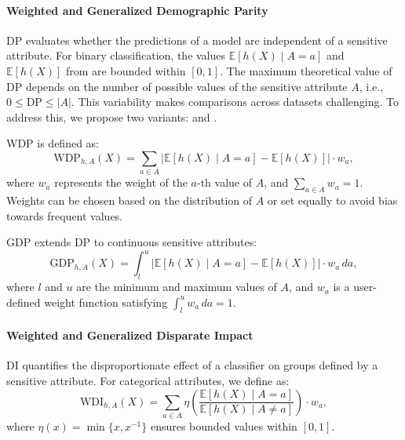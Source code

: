 \paragraph{Weighted and Generalized Demographic Parity}
%
\Gls{DP} evaluates whether the predictions of a model are independent of a sensitive attribute.
%
For binary classification, the values \( \mathbb{E}[h(X) \mid A = a] \) and \( \mathbb{E}[h(X)] \) from  are bounded within \([0, 1]\).
%
The maximum theoretical value of \gls{DP} depends on the number of possible values of the sensitive attribute \( A \), i.e., \( 0 \leq \text{DP} \leq |A| \).
%
This variability makes comparisons across datasets challenging.
%
To address this, we propose two variants:  and .


\Gls{WDP} is defined as:
%
\begin{equation}
    \label{eq:wdp}
    \text{WDP}_{h,A}(X) = \sum_{a \in A} \left| \mathbb{E}[h(X) \mid A = a] - \mathbb{E}[h(X)] \right| \cdot w_a,
\end{equation}
%
where \( w_a \) represents the weight of the \( a \)-th value of \( A \), and \( \sum_{a \in A} w_a = 1 \).
%
Weights can be chosen based on the distribution of \( A \) or set equally to avoid bias towards frequent values.


\Gls{GDP} extends \gls{DP} to continuous sensitive attributes:
%
\begin{equation}
    \label{eq:gdp}
    \text{GDP}_{h,A}(X) = \int_{l}^{u} \left| \mathbb{E}[h(X) \mid A = a] - \mathbb{E}[h(X)] \right| \cdot w_a \, da,
\end{equation}
%
where \( l \) and \( u \) are the minimum and maximum values of \( A \), and \( w_a \) is a user-defined weight function satisfying \( \int_{l}^{u} w_a \, da = 1 \).



\paragraph{Weighted and Generalized Disparate Impact}
%
\Gls{DI} quantifies the disproportionate effect of a classifier on groups defined by a sensitive attribute.
%
For categorical attributes, we define  as:
%
\begin{equation}
    \label{eq:wdi}
    \text{WDI}_{h,A}(X) = \sum_{a \in A} \eta \left( \frac{\mathbb{E}[h(X) \mid A = a]}{\mathbb{E}[h(X) \mid A \neq a]} \right) \cdot w_a,
\end{equation}
%
where \( \eta(x) = \min\{x, x^{-1}\} \) ensures bounded values within \([0, 1]\).


